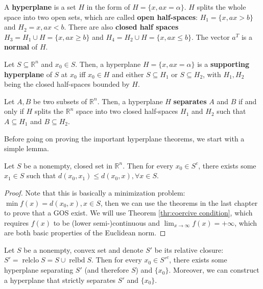 \begin{definition}
  A \textbf{hyperplane} is a set \( H \) in the form of \( H = \{x, ax =
  \alpha\}   \). \( H \) splits the whole space into two open sets, which are
  called \textbf{open half-spaces}: \( H_{1} = \{x, ax > b\}   \) and \( H_{2}
  = {x, ax < b} \). There are also \textbf{closed half spaces} \( H_{3} = H_{1}
  \cup H =
  \{x, ax \ge  b\}  \) and \( H_{4} = H_{2} \cup  H = \{x, ax \le  b\}   \). The
  vector \( a^{T} \) is a \textbf{normal} of \( H \).

  Let \( S \subseteq \mathbb{R}^{n} \) and \( x_{0} \in S \). Then, a hyperplane
  \( H = \{x, ax = \alpha\}   \) is a \textbf{supporting hyperplane} of \( S \)
  at \( x_{0} \) iff \( x_{0} \in H \) and either \( S \subseteq H_{1} \) or \(
  S \subseteq H_{2}\), with \( H_{1}, H_{2} \) being the closed half-spaces
  bounded by \( H \).

  Let \( A, B \) be two subsets of \( \mathbb{R}^{n} \). Then, a hyperplane \( H
  \) \textbf{separates} \( A \) and \( B \) if and only if \( H \) splits the \(
  \mathbb{R}^{n}\) space into two closed half-spaces \( H_{1} \) and \( H_{2} \)
  such that \( A \subseteq H_{1} \) and \( B \subseteq H_{2} \).
\end{definition}

Before going on proving the important hyperplane theorems, we start with a
simple lemma.

\begin{lemma}
\label{lem:Existence of closest element}
  Let \( S \) be a nonempty, closed set in \( \mathbb{R}^{n} \).
  Then for every \( x_{0} \in S^{c} \), there exists some \( x_{1} \in S \)
  such that \( d(x_{0}, x_{1}) \le d(x_{0}, x), \forall x \in S \).
\end{lemma}

\begin{proof}
  Note that this is basically a minimization problem: \( \min f(x) = d(x_{0}, x), x \in
  S\), then we can use the theorems in the last chapter to prove that a GOS
  exist. We will use Theorem \ref{thr:coercive condition}, which requires \(
  f(x) \) to be (lower semi-)continuous and \( \lim_{x \to \infty} f(x) =
  +\infty \), which are both basic properties of the Euclidean norm.
\end{proof}

\begin{theorem}
\label{thr:hst-closed-pt}
  Let \( S \) be a nonempty, convex set and denote \( S' \) be its relative
  closure: \( S' = \operatorname{relclo} S = S \cup \operatorname{relbd} S \).
  Then for every \( x_{0} \in S'^{c} \),
  there exists some hyperplane separating \( S' \) (and therefore \( S \))
  and \( \{x_{0}\}   \). Moreover, we can construct a hyperplane that strictly
  separates \( S' \) and \( \{x_{0}\}   \).
\end{theorem}


